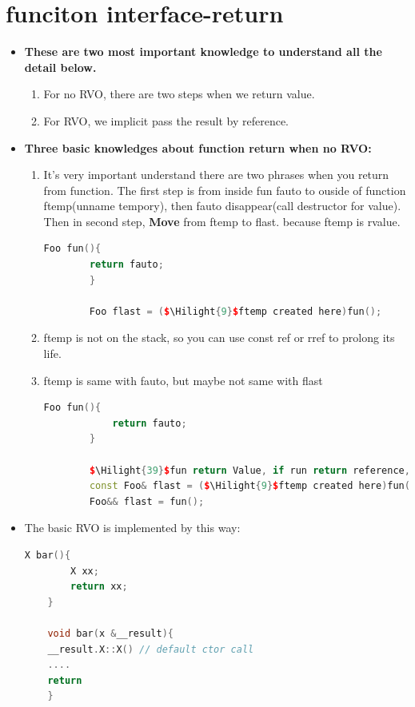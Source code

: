 \documentclass[a4paper,12pt,twoside]{book}
\newcommand{\Hilight}[1]{\makebox[0pt][l]{\color{yellow}\rule[-3pt]{#1em}{11pt}}}
\begin{document}
\section{funciton interface-return}
\begin{itemize}
	\item \textbf{These are two most important knowledge to understand all the detail below.}
	\begin{enumerate}
		\item For no RVO, there are two steps when we return value.
		\item For RVO, we implicit pass the result by reference.
	\end{enumerate}
	
	\item \textbf{Three basic knowledges about function return when no RVO:}
	\begin{enumerate}
		\item It's very important understand there are two phrases when you return from function. The first step  is from inside fun fauto to ouside of function ftemp(unname tempory), then fauto disappear(call destructor for value).  Then in second step, \textbf{Move} from ftemp to flast. because ftemp is rvalue.
		\begin{lstlisting}[frame=single, language=c++]
		Foo fun(){
		return fauto;
		}
		
		Foo flast = ($\Hilight{9}$ftemp created here)fun();
		\end{lstlisting}
		\item ftemp is not on the stack, so you can use const ref or rref to prolong its life.
		
		\item ftemp is same with fauto, but maybe not same with flast
		\begin{lstlisting}[frame=single, language=c++]
		Foo fun(){
			return fauto;
		}
		
		$\Hilight{39}$fun return Value, if run return reference, it's dangerous.
		const Foo& flast = ($\Hilight{9}$ftemp created here)fun();
		Foo&& flast = fun();
		\end{lstlisting}
	\end{enumerate}
	
	\item The basic RVO is implemented by this way:
	\begin{lstlisting}[frame=single, language=c++]
	X bar(){
		X xx;
		return xx;
	}
	
	void bar(x &__result){
	__result.X::X() // default ctor call
	....
	return
	}
	 \end{lstlisting}
	
\end{itemize}
\end{document}

